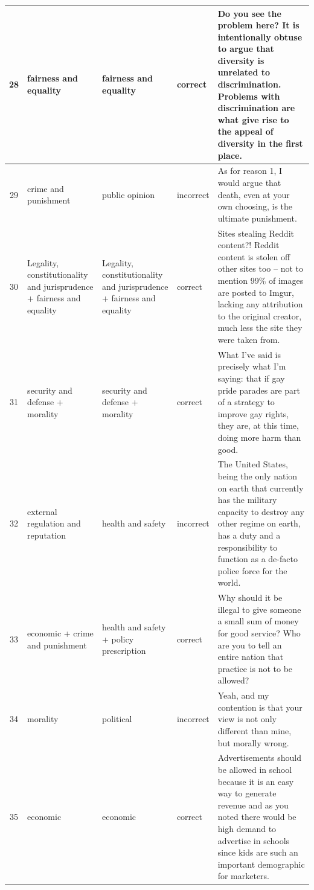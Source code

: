 \documentclass[
10pt, %
a4paper, %
oneside, %
headinclude,footinclude, %
] {book}%
\begin{document}
\begin{longtable}{|c|p{2.5cm}|p{2.5cm}|p{2.5cm}|p{4.0cm}|}
28 & fairness and equality & fairness and equality & correct & Do you see the problem here? It is intentionally obtuse to argue that diversity is unrelated to discrimination. Problems with discrimination are what give rise to the appeal of diversity in the first place. \\ \hline

29 & crime and punishment & public opinion & incorrect & As for reason 1, I would argue that death, even at your own choosing, is the ultimate punishment. \\ \hline

30 & Legality, constitutionality and jurisprudence + fairness and equality & Legality, constitutionality and jurisprudence + fairness and equality & correct & Sites stealing Reddit content?! Reddit content is stolen off other sites too -- not to mention 99\% of images are posted to Imgur, lacking any attribution to the original creator, much less the site they were taken from. \\ \hline

31 & security and defense + morality & security and defense + morality & correct & What I've said is precisely what I'm saying: that if gay pride parades are part of a strategy to improve gay rights, they are, at this time, doing more harm than good. \\ \hline

32 & external regulation and reputation & health and safety & incorrect & The United States, being the only nation on earth that currently has the military capacity to destroy any other regime on earth, has a duty and a responsibility to function as a de-facto police force for the world. \\ \hline

33 & economic + crime and punishment & health and safety + policy prescription & correct & Why should it be illegal to give someone a small sum of money for good service? Who are you to tell an entire nation that practice is not to be allowed? \\ \hline

34 & morality & political & incorrect & Yeah, and my contention is that your view is not only different than mine, but morally wrong. \\ \hline

35 & economic & economic & correct & Advertisements should be allowed in school because it is an easy way to generate revenue and as you noted there would be high demand to advertise in schools since kids are such an important demographic for marketers. \\ \hline


\end{longtable}
\end{document}
